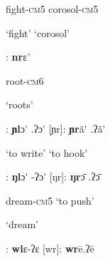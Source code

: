 \begin{styleindexi}
                      fight-\textsc{cm}5                                         corosol-\textsc{cm}5                          
\end{styleindexi}

\begin{styleindexi}
                      ‘fight’                                               ‘corosol’                               
\end{styleindexi}

\begin{styleindexi}
          [nr]:      \textbf{nr}ɛ\`{}  
\end{styleindexi}

\begin{styleindexi}
                      root-\textsc{cm}6
\end{styleindexi}

\begin{styleindexi}
                      ‘roots’
\end{styleindexi}

\begin{styleindexi}
          [ɲl]:       \textbf{ɲl}ɔ\'{} .ʔɔ\'{}                                   [ɲr]:      \textbf{ɲr}ã\'{} .ʔã\'{}          
\end{styleindexi}

\begin{styleindexi}
                      ‘to write’                                          ‘to hook’    
\end{styleindexi}

\begin{styleindexi}
          [ŋl]:       \textbf{ŋl}ɔ\'{} -ʔɔ\'{}                                   [ŋr]:       \textbf{ŋr}ɔ\={} .ʔɔ\={} ~ ~        
\end{styleindexi}

\begin{styleindexi}
                      dream-\textsc{cm}5                                         ‘to push’
\end{styleindexi}

\begin{styleindexi}
                      ‘dream’
\end{styleindexi}

\begin{styleindexi}
          [wl]:       \textbf{wl}ɛ{}-ʔɛ                                  [wr]:       \textbf{wr}ē.ʔē      
\end{styleindexi}

